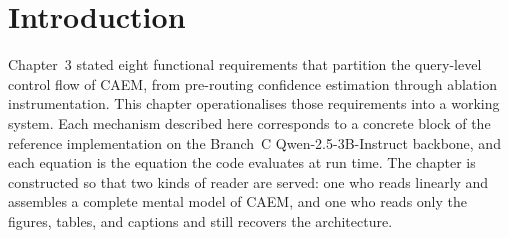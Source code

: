 
\section{Introduction}
\label{sec:ch4-intro}

Chapter~3 stated eight functional requirements that partition the query-level control flow of CAEM, from pre-routing confidence estimation through ablation instrumentation. This chapter operationalises those requirements into a working system. Each mechanism described here corresponds to a concrete block of the reference implementation on the Branch~C Qwen-2.5-3B-Instruct backbone, and each equation is the equation the code evaluates at run time. The chapter is constructed so that two kinds of reader are served: one who reads linearly and assembles a complete mental model of CAEM, and one who reads only the figures, tables, and captions and still recovers the architecture.

